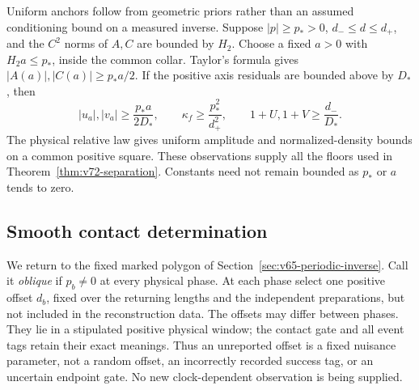 Uniform anchors follow from geometric priors rather than an assumed
conditioning bound on a measured inverse.  Suppose $|p|\ge p_*>0$,
$d_-\le d\le d_+$, and the $C^2$ norms of $A,C$ are bounded by $H_2$.
Choose a fixed $a>0$ with $H_2a\le p_*$, inside the common collar.
Taylor's formula gives $|A(a)|,|C(a)|\ge p_*a/2$.  If the positive
axis residuals are bounded above by $D_*$, then
\[
 |u_a|,|v_a|\ge \frac{p_*a}{2D_*},\qquad
 \kappa_f\ge\frac{p_*^2}{d_+^2},\qquad
 1+U,1+V\ge\frac{d_-}{D_*}.
\]
The physical relative law gives uniform amplitude and normalized-density
bounds on a common positive square.  These observations supply all the
floors used in Theorem~\ref{thm:v72-separation}.  Constants need not
remain bounded as $p_*$ or $a$ tends to zero.

\subsection{Smooth contact determination}

We return to the fixed marked polygon of
Section~\ref{sec:v65-periodic-inverse}.  Call it \emph{oblique} if
$p_b\ne0$ at every physical phase.  At each phase select one positive
offset $d_b$, fixed over the returning lengths and the independent
preparations, but not included in the reconstruction data.  The offsets
may differ between phases.  They lie in a stipulated positive physical
window; the contact gate and all event tags retain their exact meanings.
Thus an unreported offset is a fixed nuisance parameter, not a random
offset, an incorrectly recorded success tag, or an uncertain endpoint
gate.  No new clock-dependent observation is being supplied.

